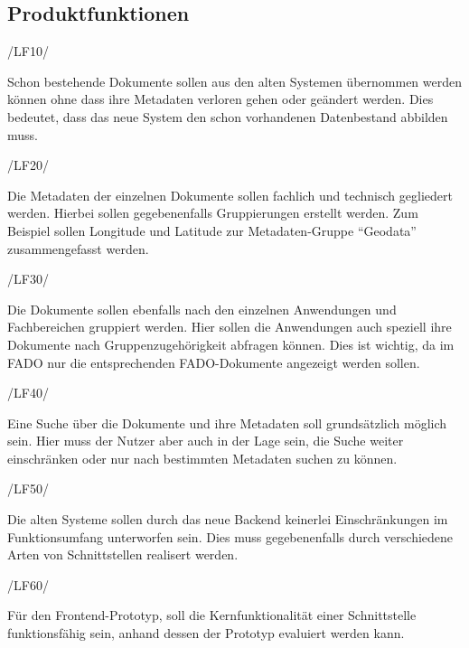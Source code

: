\subsection{Produktfunktionen} \label{Produktfunktionen}
\begin{minipage}{3cm}
/LF10/
\end{minipage}
\begin{minipage}{13cm}
Schon bestehende Dokumente sollen aus den alten Systemen \"ubernommen werden k\"onnen ohne dass ihre Metadaten verloren gehen oder ge\"andert werden. Dies bedeutet, dass das neue System den schon vorhandenen Datenbestand abbilden muss.\\
\end{minipage}
\begin{minipage}{3cm}
/LF20/
\end{minipage}
\begin{minipage}{13cm}
Die Metadaten der einzelnen Dokumente sollen fachlich und technisch gegliedert werden. Hierbei sollen gegebenenfalls Gruppierungen erstellt werden. Zum Beispiel sollen Longitude und Latitude zur Metadaten-Gruppe "`Geodata"' zusammengefasst werden.\\
\end{minipage}
\begin{minipage}{3cm}
/LF30/
\end{minipage}
\begin{minipage}{13cm}
Die Dokumente sollen ebenfalls nach den einzelnen Anwendungen und Fachbereichen gruppiert werden. Hier sollen die Anwendungen auch speziell ihre Dokumente nach Gruppenzugeh\"origkeit abfragen k\"onnen. Dies ist wichtig, da im \ac{FADO} nur die entsprechenden \ac{FADO}-Dokumente angezeigt werden sollen.\\
\end{minipage}
\begin{minipage}{3cm}
/LF40/
\end{minipage}
\begin{minipage}{13cm}
Eine Suche \"uber die Dokumente und ihre Metadaten soll grunds\"atzlich m\"oglich sein. Hier muss der Nutzer aber auch in der Lage sein, die Suche weiter einschr\"anken oder nur nach bestimmten Metadaten suchen zu k\"onnen.\\
\end{minipage}
\begin{minipage}{3cm}
/LF50/
\end{minipage}
\begin{minipage}{13cm}
Die alten Systeme sollen durch das neue Backend keinerlei Einschr\"ankungen im Funktionsumfang unterworfen sein. Dies muss gegebenenfalls durch verschiedene Arten von Schnittstellen realisert werden.\\
\end{minipage}
\begin{minipage}{3cm}
/LF60/
\end{minipage}
\begin{minipage}{13cm}
F\"ur den Frontend-Prototyp, soll die Kernfunktionalit\"at einer Schnittstelle funktionsf\"ahig sein, anhand dessen der Prototyp evaluiert werden kann.\\
\end{minipage}


